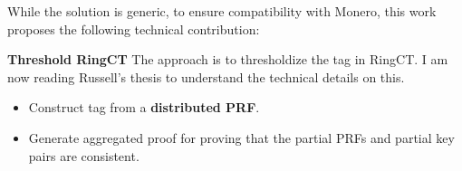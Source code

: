 \documentclass{article}
\begin{document}


While the solution is generic, to ensure compatibility with Monero, this work proposes the following technical contribution:

\medskip

\noindent \textbf{{Threshold RingCT}} The approach is to thresholdize the tag in RingCT. I am now reading Russell's thesis to understand the technical details on this.
\begin{itemize}
    \item Construct tag from a \textbf{distributed PRF}.
    \item Generate aggregated proof for proving that the partial PRFs and partial key pairs are consistent.
   \end{itemize}
\end{document}
